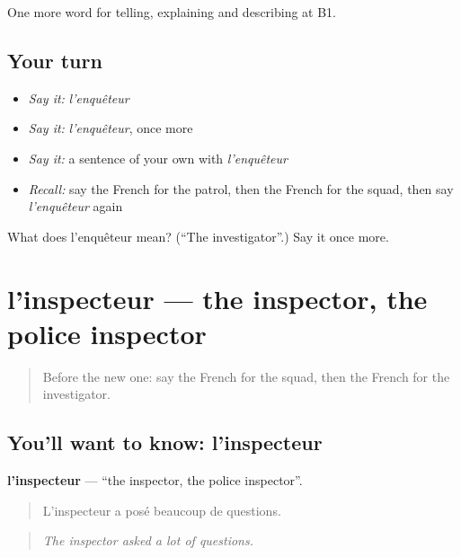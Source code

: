 \begin{grammarlens}[title={What you've built}]
One more word for telling, explaining and describing at B1.
\end{grammarlens}

\subsection*{Your turn}
\begin{itemize}
\raggedright
  \item \emph{Say it:} \emph{l'enquêteur}
  \item \emph{Say it:} \emph{l'enquêteur}, once more
  \item \emph{Say it:} a sentence of your own with \emph{l'enquêteur}
  \item \emph{Recall:} say the French for the patrol, then the French for the squad, then say \emph{l'enquêteur} again
\end{itemize}

\begin{tcolorbox}[breakable,colback=teal!4,colframe=teal!35!black,title={Before you move on}]
What does l'enquêteur mean? (\textquotedblleft{}The investigator\textquotedblright{}.) Say it once more.
\end{tcolorbox}
\section[l'inspecteur]{l'inspecteur — the inspector, the police inspector}

\label{lesson:FR-C292-inspecteur}



\begin{quote}
Before the new one: say the French for the squad, then the French for the investigator.
\end{quote}

\subsection*{You'll want to know: l'inspecteur}
\textbf{l'inspecteur} — \textquotedblleft{}the inspector, the police inspector\textquotedblright{}.

\begin{quote}
L'inspecteur a posé beaucoup de questions.
\end{quote}

\begin{quote}
\emph{The inspector asked a lot of questions.}
\end{quote}

